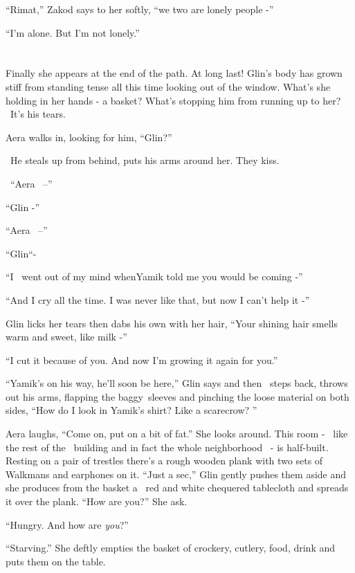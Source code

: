 \documentclass[twoside,11pt]{book}
\begin{document}
``Rimat,'' Zakod says to her softly, ``we two are lonely people -''

``I'm alone. But I'm not lonely.''


\bigskip

\chapter{}

Finally she appears at the end of the path. At long last! Glin's body has grown stiff from standing
tense{ }all this time looking out of the window. What's she holding in her
hands - a basket? What's stopping him from running up to her? \ It's his tears.

Aera walks in, looking for him, ``Glin?''

~He steals up from behind, puts his arms around her. They kiss.

~``Aera~ --''

``Glin -''

``Aera~ --''

``Glin``-

``I \ went out of my mind whenYamik told me you would be coming -''

``And I cry all the time. I was never like that, but now I can't help it -''

Glin licks her tears then dabs his own{ }with her hair, ``Your
shining hair smells warm and sweet, like milk -''

``I cut it because of you. And now I'm growing it again for you.''

``Yamik's on his way, he'll soon be here,'' Glin says and then \ steps back, throws
out{ }his arms, flapping the baggy~sleeves and pinching the loose material on
both sides, ``How do I look in Yamik's shirt? Like a scarecrow? ''

Aera laughs, ``Come on, put on a bit of fat.'' She looks around. This room - \ like the rest
of the \ building and in fact the whole neighborhood \ {}- is half{{}-}built.
Resting on a pair of trestles there's a rough wooden plank with two sets of Walkmans and earphones on it.
``Just a sec,'' Glin gently pushes them aside and she produces from the basket a \ red and
white chequered tablecloth and spreads it over the plank. ``How are you?'' She ask.

``Hungry. And how are \textit{you}?''

``Starving.'' She deftly empties the basket of crockery, cutlery, food, drink and puts them on
the table.
\end{document}
